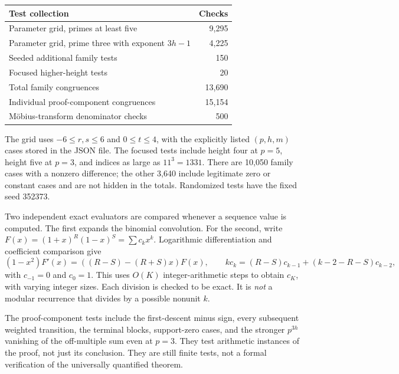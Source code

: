 \documentclass[11pt,a4paper]{article}
\numberwithin{equation}{section}
\theoremstyle{research}
\theoremstyle{definition}
\begin{document}
\begin{center}
\begin{tabular}{@{}lr@{}}
\toprule
Test collection & Checks \\
\midrule
Parameter grid, primes at least five & 9,295 \\
Parameter grid, prime three with exponent $3h-1$ & 4,225 \\
Seeded additional family tests & 150 \\
Focused higher-height tests & 20 \\
\midrule
Total family congruences & 13,690 \\
Individual proof-component congruences & 15,154 \\
M\"obius-transform denominator checks & 500 \\
\bottomrule
\end{tabular}
\end{center}
The grid uses $-6\le r,s\le6$ and $0\le t\le4$, with the explicitly
listed $(p,h,m)$ cases stored in the JSON file. The focused tests include
height four at $p=5$, height five at $p=3$, and indices as large as
$11^3=1331$. There are 10,050 family cases with a nonzero difference;
the other 3,640 include legitimate zero or constant cases and are not
hidden in the totals. Randomized tests have the fixed seed 352373.

Two independent exact evaluators are compared whenever a sequence value
is computed. The first expands the binomial convolution. For the second,
write $F(x)=(1+x)^R(1-x)^S=\sum c_kx^k$. Logarithmic differentiation
and coefficient comparison give
\begin{equation}\label{eq:recurrence}
 (1-x^2)F'(x)=((R-S)-(R+S)x)F(x),\qquad
 k c_k=(R-S)c_{k-1}+(k-2-R-S)c_{k-2},
\end{equation}
with $c_{-1}=0$ and $c_0=1$. This uses $O(K)$ integer-arithmetic steps to
obtain $c_K$, with varying integer sizes. Each division is checked to be
exact. It is \emph{not} a modular recurrence that divides by a possible
nonunit $k$.

The proof-component tests include the first-descent minus sign, every
subsequent weighted transition, the terminal blocks, support-zero cases,
and the stronger $p^{3h}$ vanishing of the off-multiple sum even at $p=3$.
They test arithmetic instances of the proof, not just its conclusion.
They are still finite tests, not a formal verification of the universally
quantified theorem.
\end{document}

